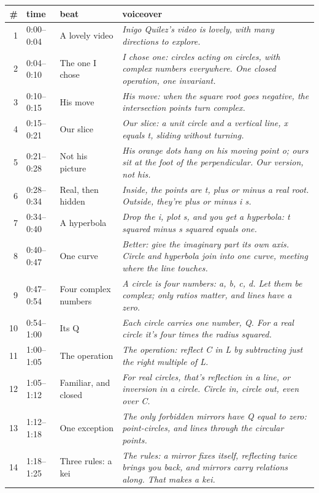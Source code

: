 \documentclass[10pt]{article}
\begin{document}
{\scriptsize\begin{longtable}{rllp{}}\toprule \# & time & beat & voiceover\\\midrule
1 & 0:00--0:04 & A lovely video & \emph{Inigo Quilez's video is lovely, with many directions to explore.}\\
2 & 0:04--0:10 & The one I chose & \emph{I chose one: circles acting on circles, with complex numbers everywhere. One closed operation, one invariant.}\\
3 & 0:10--0:15 & His move & \emph{His move: when the square root goes negative, the intersection points turn complex.}\\
4 & 0:15--0:21 & Our slice & \emph{Our slice: a unit circle and a vertical line, x equals t, sliding without turning.}\\
5 & 0:21--0:28 & Not his picture & \emph{His orange dots hang on his moving point o; ours sit at the foot of the perpendicular. Our version, not his.}\\
6 & 0:28--0:34 & Real, then hidden & \emph{Inside, the points are t, plus or minus a real root. Outside, they're plus or minus i s.}\\
7 & 0:34--0:40 & A hyperbola & \emph{Drop the i, plot s, and you get a hyperbola: t squared minus s squared equals one.}\\
8 & 0:40--0:47 & One curve & \emph{Better: give the imaginary part its own axis. Circle and hyperbola join into one curve, meeting where the line touches.}\\
9 & 0:47--0:54 & Four complex numbers & \emph{A circle is four numbers: a, b, c, d. Let them be complex; only ratios matter, and lines have a zero.}\\
10 & 0:54--1:00 & Its Q & \emph{Each circle carries one number, Q. For a real circle it's four times the radius squared.}\\
11 & 1:00--1:05 & The operation & \emph{The operation: reflect C in L by subtracting just the right multiple of L.}\\
12 & 1:05--1:12 & Familiar, and closed & \emph{For real circles, that's reflection in a line, or inversion in a circle. Circle in, circle out, even over C.}\\
13 & 1:12--1:18 & One exception & \emph{The only forbidden mirrors have Q equal to zero: point-circles, and lines through the circular points.}\\
14 & 1:18--1:25 & Three rules: a kei & \emph{The rules: a mirror fixes itself, reflecting twice brings you back, and mirrors carry relations along. That makes a kei.}\\

\end{longtable}}
\end{document}
